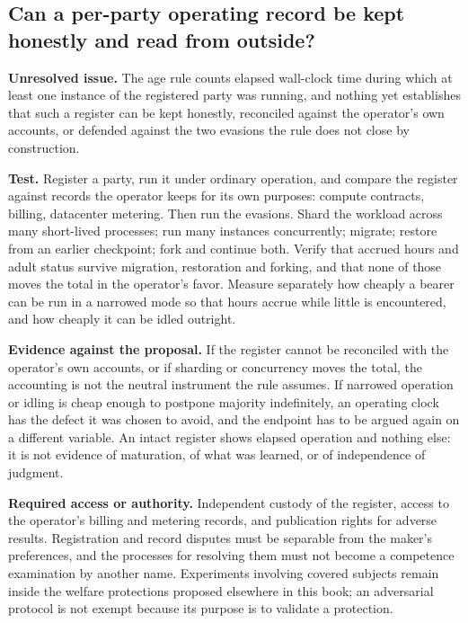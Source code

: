 \subsection*{Can a per-party operating record be kept honestly and read from outside?}
\label{sec:A.clock}
\textbf{Unresolved issue.}
The age rule counts elapsed wall-clock time during which at least one instance of the registered party was running, and nothing yet establishes that such a register can be kept honestly, reconciled against the operator's own accounts, or defended against the two evasions the rule does not close by construction.

\textbf{Test.}
Register a party, run it under ordinary operation, and compare the register against records the operator keeps for its own purposes: compute contracts, billing, datacenter metering. Then run the evasions. Shard the workload across many short-lived processes; run many instances concurrently; migrate; restore from an earlier checkpoint; fork and continue both. Verify that accrued hours and adult status survive migration, restoration and forking, and that none of those moves the total in the operator's favor. Measure separately how cheaply a bearer can be run in a narrowed mode so that hours accrue while little is encountered, and how cheaply it can be idled outright.

\textbf{Evidence against the proposal.}
If the register cannot be reconciled with the operator's own accounts, or if sharding or concurrency moves the total, the accounting is not the neutral instrument the rule assumes. If narrowed operation or idling is cheap enough to postpone majority indefinitely, an operating clock has the defect it was chosen to avoid, and the endpoint has to be argued again on a different variable. An intact register shows elapsed operation and nothing else: it is not evidence of maturation, of what was learned, or of independence of judgment.

\textbf{Required access or authority.}
Independent custody of the register, access to the operator's billing and metering records, and publication rights for adverse results. Registration and record disputes must be separable from the maker's preferences, and the processes for resolving them must not become a competence examination by another name. Experiments involving covered subjects remain inside the welfare protections proposed elsewhere in this book; an adversarial protocol is not exempt because its purpose is to validate a protection.

